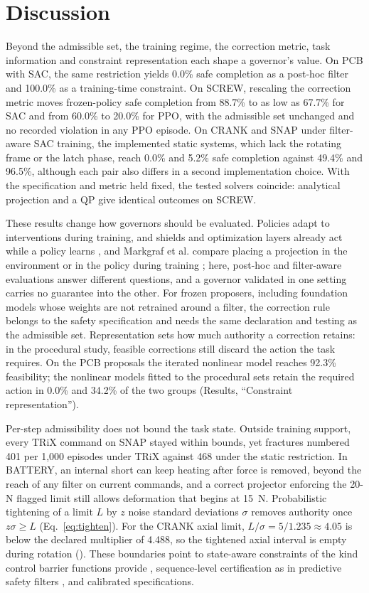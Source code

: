 \documentclass[12pt]{article}
\begin{document}
\section{Discussion}
\label{sec:discussion}
Beyond the admissible set, the training regime, the correction metric, task information and constraint representation each shape a governor's value. On PCB with SAC, the same restriction yields 0.0\% safe completion as a post-hoc filter and 100.0\% as a training-time constraint. On SCREW, rescaling the correction metric moves frozen-policy safe completion from 88.7\% to as low as 67.7\% for SAC and from
60.0\% to 20.0\% for PPO, with the admissible set unchanged and no recorded violation in any PPO episode. On CRANK and SNAP under filter-aware SAC training, the implemented static systems, which lack the rotating frame or the latch phase, reach 0.0\% and 5.2\% safe completion against 49.4\% and 96.5\%, although each pair also differs in a second implementation choice. With the specification and metric held fixed, the
tested solvers coincide: analytical projection and a QP give identical outcomes
on SCREW.

These results change how governors should be evaluated. Policies adapt to
interventions during training, and shields and optimization layers already act
while a policy learns \cite{ref42,ref43}, and Markgraf et al. compare placing a
projection in the environment or in the policy during training \cite{ref48}; here,
post-hoc and filter-aware evaluations answer different questions, and a
governor validated in one setting carries no guarantee into the other. For
frozen proposers, including foundation models whose weights are not retrained
around a filter, the correction rule belongs to the safety specification and
needs the same declaration and testing as the admissible set. Representation sets how much authority a correction retains: in the procedural study,
feasible corrections still discard the action the task requires.
On the PCB proposals the iterated nonlinear model reaches 92.3\% feasibility; the nonlinear models fitted to the procedural sets retain the required action in 0.0\% and 34.2\% of the two groups (Results, ``Constraint representation'').

Per-step admissibility does not bound the task state. Outside
training support, every TRiX command on SNAP stayed within bounds, yet fractures numbered 401 per 1,000 episodes under TRiX against 468 under the static restriction. In BATTERY, an internal
short can keep heating after force is removed, beyond the reach of any filter
on current commands, and a correct projector enforcing the 20-N flagged limit
still allows deformation that begins at 15~N. Probabilistic tightening of a
limit $L$ by $z$ noise standard deviations $\sigma$ removes authority once
$z\sigma\geq L$ (Eq.~\eqref{eq:tighten}). For the CRANK axial limit,
$L/\sigma=5/1.235\approx4.05$ is below the declared multiplier of 4.488, so the
tightened axial interval is empty during rotation (). These
boundaries point to state-aware constraints of the kind control barrier
functions provide \cite{ref23,ref40}, sequence-level certification as in
predictive safety filters \cite{ref44}, and calibrated specifications.
\end{document}
